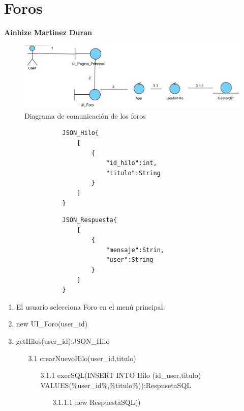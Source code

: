 ﻿\documentclass{report}
\begin{document}
        \section{Foros}
            \textbf{Ainhize Martinez Duran}
            \begin{figure}[H]
                \centering
                \includegraphics[width=1.0\textwidth]{img/comunicacion/foros1.png}
                \caption{Diagrama de comunicación de los foros}
            \end{figure}
            \begin{verbatim}
                JSON_Hilo{
                    [
                        {
                            "id_hilo":int,
                            "titulo":String
                        }
                    ]
                }
            \end{verbatim}
            \begin{verbatim}
                JSON_Respuesta{
                    [
                        {
                            "mensaje":Strin,
                            "user":String
                        }
                    ]
                }
            \end{verbatim}
            \begin{enumerate}
                \item El usuario selecciona Foro en el menú principal.
                \item new UI\_Foro(user\_id)
                \item getHilos(user\_id):JSON\_Hilo
                \begin{enumerate}
                    \item [3.1] crearNuevoHilo(user\_id,titulo)
                    \begin{enumerate}
                        \item [3.1.1] execSQL(INSERT INTO Hilo (id\_user,titulo) VALUES(\%user\_id\%,\%titulo\%)):RespusetaSQL
                        \begin{enumerate}
                            \item [3.1.1.1] new RespuestaSQL()
                        \end{enumerate}
                    \end{enumerate}
                \end{enumerate}
            \end{enumerate}
            
\end{document}
